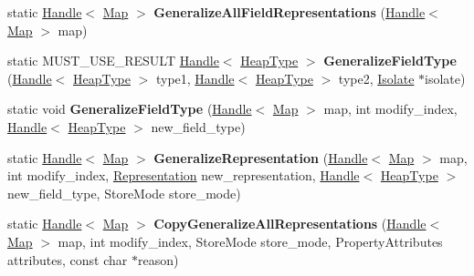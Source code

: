 \begin{DoxyCompactItemize}
\item 
\hypertarget{classv8_1_1internal_1_1_map_a8ff46868ab15d0821681329c69020a5c}{}static \hyperlink{classv8_1_1internal_1_1_handle}{Handle}$<$ \hyperlink{classv8_1_1internal_1_1_map}{Map} $>$ {\bfseries Generalize\+All\+Field\+Representations} (\hyperlink{classv8_1_1internal_1_1_handle}{Handle}$<$ \hyperlink{classv8_1_1internal_1_1_map}{Map} $>$ map)\label{classv8_1_1internal_1_1_map_a8ff46868ab15d0821681329c69020a5c}

\item 
\hypertarget{classv8_1_1internal_1_1_map_a157a51584dcee3ca55cc03a37cd0bec4}{}static M\+U\+S\+T\+\_\+\+U\+S\+E\+\_\+\+R\+E\+S\+U\+L\+T \hyperlink{classv8_1_1internal_1_1_handle}{Handle}$<$ \hyperlink{classv8_1_1internal_1_1_type_impl}{Heap\+Type} $>$ {\bfseries Generalize\+Field\+Type} (\hyperlink{classv8_1_1internal_1_1_handle}{Handle}$<$ \hyperlink{classv8_1_1internal_1_1_type_impl}{Heap\+Type} $>$ type1, \hyperlink{classv8_1_1internal_1_1_handle}{Handle}$<$ \hyperlink{classv8_1_1internal_1_1_type_impl}{Heap\+Type} $>$ type2, \hyperlink{classv8_1_1internal_1_1_isolate}{Isolate} $\ast$isolate)\label{classv8_1_1internal_1_1_map_a157a51584dcee3ca55cc03a37cd0bec4}

\item 
\hypertarget{classv8_1_1internal_1_1_map_a7a57ae926b7fe46b1b6c2f9dd6c1c8c5}{}static void {\bfseries Generalize\+Field\+Type} (\hyperlink{classv8_1_1internal_1_1_handle}{Handle}$<$ \hyperlink{classv8_1_1internal_1_1_map}{Map} $>$ map, int modify\+\_\+index, \hyperlink{classv8_1_1internal_1_1_handle}{Handle}$<$ \hyperlink{classv8_1_1internal_1_1_type_impl}{Heap\+Type} $>$ new\+\_\+field\+\_\+type)\label{classv8_1_1internal_1_1_map_a7a57ae926b7fe46b1b6c2f9dd6c1c8c5}

\item 
\hypertarget{classv8_1_1internal_1_1_map_a3250f8c523e54d806a8ab1298b9c9543}{}static \hyperlink{classv8_1_1internal_1_1_handle}{Handle}$<$ \hyperlink{classv8_1_1internal_1_1_map}{Map} $>$ {\bfseries Generalize\+Representation} (\hyperlink{classv8_1_1internal_1_1_handle}{Handle}$<$ \hyperlink{classv8_1_1internal_1_1_map}{Map} $>$ map, int modify\+\_\+index, \hyperlink{classv8_1_1internal_1_1_representation}{Representation} new\+\_\+representation, \hyperlink{classv8_1_1internal_1_1_handle}{Handle}$<$ \hyperlink{classv8_1_1internal_1_1_type_impl}{Heap\+Type} $>$ new\+\_\+field\+\_\+type, Store\+Mode store\+\_\+mode)\label{classv8_1_1internal_1_1_map_a3250f8c523e54d806a8ab1298b9c9543}

\item 
\hypertarget{classv8_1_1internal_1_1_map_a5375542928c2c512110a8aa9d3896a29}{}static \hyperlink{classv8_1_1internal_1_1_handle}{Handle}$<$ \hyperlink{classv8_1_1internal_1_1_map}{Map} $>$ {\bfseries Copy\+Generalize\+All\+Representations} (\hyperlink{classv8_1_1internal_1_1_handle}{Handle}$<$ \hyperlink{classv8_1_1internal_1_1_map}{Map} $>$ map, int modify\+\_\+index, Store\+Mode store\+\_\+mode, Property\+Attributes attributes, const char $\ast$reason)\label{classv8_1_1internal_1_1_map_a5375542928c2c512110a8aa9d3896a29}


\end{DoxyCompactItemize}
